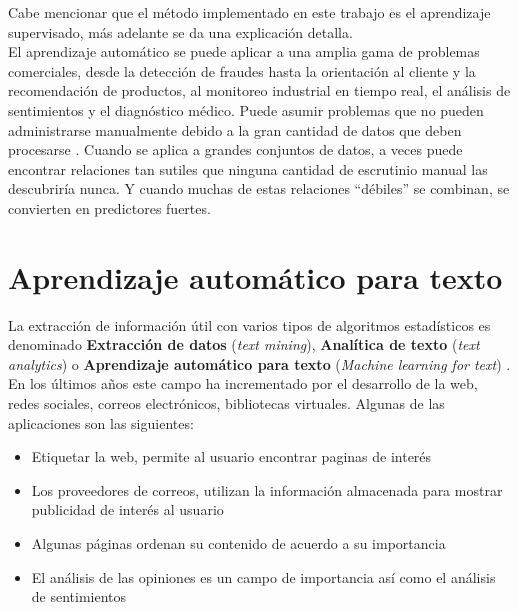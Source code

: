 Cabe mencionar que el método implementado en este trabajo es el aprendizaje supervisado, más adelante se da una explicación detalla.\\

El aprendizaje automático se puede aplicar a una amplia gama de problemas comerciales, desde la detección de fraudes hasta la orientación al cliente y la recomendación de productos, al monitoreo industrial en tiempo real, el análisis de sentimientos y el diagnóstico médico. Puede asumir problemas que no pueden administrarse manualmente debido a la gran cantidad de datos que deben procesarse \citep{CT22}. Cuando se aplica a grandes conjuntos de datos, a veces puede encontrar relaciones tan sutiles que ninguna cantidad de escrutinio manual las descubriría nunca. Y cuando muchas de estas relaciones ``débiles'' se combinan, se convierten en predictores fuertes.






\section[AA Para texto]{Aprendizaje automático para texto}

La extracción de información útil con varios tipos de algoritmos estadísticos es denominado \textbf{Extracción de datos} (\textit{text mining}), \textbf{Analítica de texto} (\textit{text analytics}) o \textbf{Aprendizaje automático para texto} (\textit{Machine learning for text}) \citep{CD1}. En los últimos años este campo ha incrementado por el desarrollo de la web, redes sociales, correos electrónicos, bibliotecas virtuales. Algunas de las aplicaciones son las siguientes:

\begin{itemize}

	\item Etiquetar la web, permite al usuario encontrar paginas de interés

	\item Los proveedores de correos, utilizan la información almacenada para mostrar publicidad de interés al usuario

	\item Algunas páginas ordenan su contenido de acuerdo a su importancia

	\item El análisis de las opiniones es un campo de importancia así como el análisis de sentimientos		

\end{itemize}

